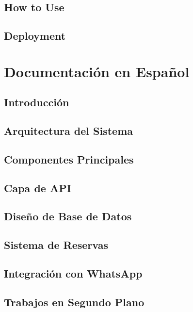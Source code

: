 \documentclass[12pt,a4paper]{report}
\begin{document}
\chapter{How to Use}


\chapter{Deployment}


\part{Documentación en Español}

\chapter{Introducción}


\chapter{Arquitectura del Sistema}


\chapter{Componentes Principales}


\chapter{Capa de API}


\chapter{Diseño de Base de Datos}


\chapter{Sistema de Reservas}


\chapter{Integración con WhatsApp}


\chapter{Trabajos en Segundo Plano}

\end{document}
